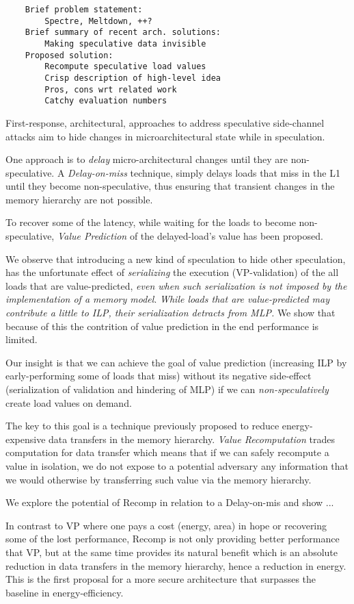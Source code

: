 \begin{verbatim}
    Brief problem statement: 
        Spectre, Meltdown, ++?
    Brief summary of recent arch. solutions: 
        Making speculative data invisible
    Proposed solution: 
        Recompute speculative load values
        Crisp description of high-level idea
        Pros, cons wrt related work
        Catchy evaluation numbers
\end{verbatim}

First-response, architectural, approaches to address speculative side-channel attacks aim to hide changes in microarchitectural state while in speculation. 

One approach is to \emph{delay} micro-architectural changes until they are non-speculative. A \emph{Delay-on-miss} technique, simply delays loads that miss in the L1 until they become non-speculative, thus ensuring that transient changes in the memory hierarchy are not possible.

To recover some of the latency, while waiting for the loads to become non-speculative, \emph{Value Prediction} of the delayed-load's value has been proposed.

We observe that introducing a new kind of speculation to hide other speculation, has the unfortunate effect of \emph{serializing} the execution (VP-validation) of the all loads that are value-predicted, \emph{even when such serialization is not imposed by the implementation of a memory model}. \emph{While loads that are value-predicted may contribute a little to ILP, their serialization detracts from MLP.} We show that because of this the contrition of value prediction in the end performance is limited.

Our insight is that we can achieve the goal of value prediction (increasing ILP by early-performing some of loads that miss) without its negative side-effect (serialization of validation and hindering of MLP) if we can \emph{non-speculatively} create load values on demand. 

The key to this goal is a technique previously proposed to reduce energy-expensive data transfers in the memory hierarchy. \emph{Value Recomputation} trades computation for data transfer which means that if we can safely recompute a value in isolation, we do not expose to a potential adversary any information that we would otherwise by transferring such value via the memory hierarchy.

We explore the potential of Recomp in relation to a Delay-on-mis and show ... 

{\color{red} In contrast to VP where one pays a cost (energy, area) in hope or recovering some of the lost performance, Recomp is not only providing better performance that VP, but at the same time provides its natural benefit which is an absolute reduction in data transfers in the memory hierarchy, hence a reduction in energy. This is the first proposal for a more secure architecture that surpasses the baseline in energy-efficiency.}


